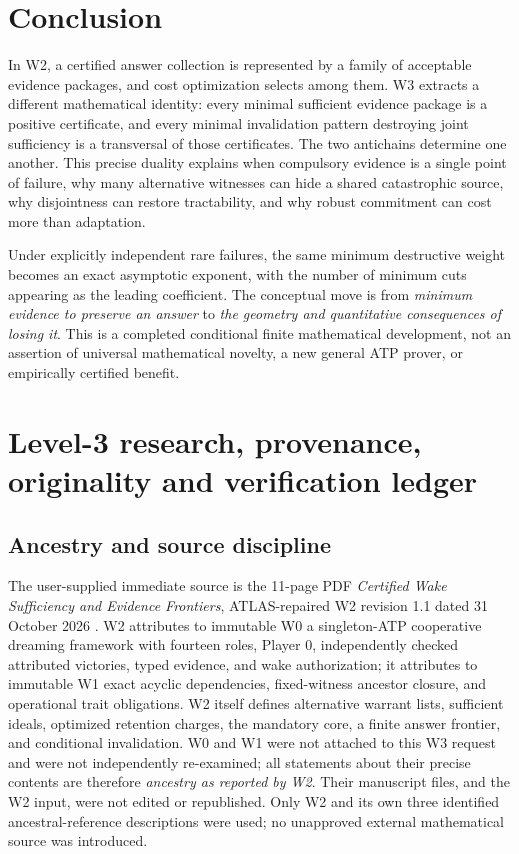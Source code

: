 \documentclass[11pt,letterpaper]{article}
\begin{document}
\section{Conclusion}\label{gl-first-W3-s8}
In W2, a certified answer collection is represented by a family of acceptable evidence packages, and cost optimization selects among them. W3 extracts a different mathematical identity: every minimal sufficient evidence package is a positive certificate, and every minimal invalidation pattern destroying joint sufficiency is a transversal of those certificates. The two antichains determine one another. This precise duality explains when compulsory evidence is a single point of failure, why many alternative witnesses can hide a shared catastrophic source, why disjointness can restore tractability, and why robust commitment can cost more than adaptation.

Under explicitly independent rare failures, the same minimum destructive weight becomes an exact asymptotic exponent, with the number of minimum cuts appearing as the leading coefficient. The conceptual move is from \emph{minimum evidence to preserve an answer} to \emph{the geometry and quantitative consequences of losing it}. This is a completed conditional finite mathematical development, not an assertion of universal mathematical novelty, a new general ATP prover, or empirically certified benefit.

\appendix
\section{Level-3 research, provenance, originality and verification ledger}\label{gl-first-W3-s9}
\subsection{Ancestry and source discipline}
The user-supplied immediate source is the 11-page PDF \emph{Certified Wake Sufficiency and Evidence Frontiers}, ATLAS-repaired W2 revision 1.1 dated 31 October 2026 \cite{W2}. W2 attributes to immutable W0 \cite{W0} a singleton-ATP cooperative dreaming framework with fourteen roles, Player 0, independently checked attributed victories, typed evidence, and wake authorization; it attributes to immutable W1 \cite{W1} exact acyclic dependencies, fixed-witness ancestor closure, and operational trait obligations. W2 itself defines alternative warrant lists, sufficient ideals, optimized retention charges, the mandatory core, a finite answer frontier, and conditional invalidation. W0 and W1 were not attached to this W3 request and were not independently re-examined; all statements about their precise contents are therefore \emph{ancestry as reported by W2}. Their manuscript files, and the W2 input, were not edited or republished. Only W2 and its own three identified ancestral-reference descriptions were used; no unapproved external mathematical source was introduced.
\end{document}

